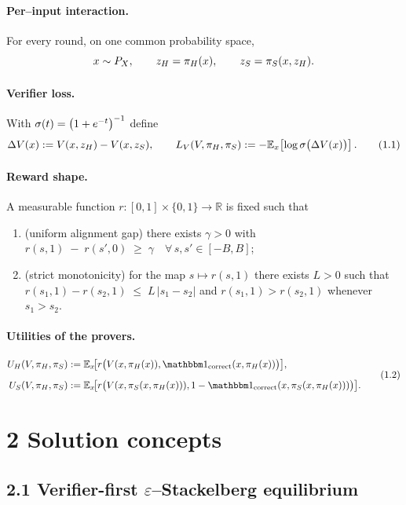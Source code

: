 \paragraph{Per–input interaction.}
For every round, on one common probability space,
\[
x\sim P_X,\qquad
z_H=\pi_H(x),\qquad
z_S=\pi_S(x,z_H).
\]

\paragraph{Verifier loss.}
With $\sigma(t)=\bigl(1+e^{-t}\bigr)^{-1}$ define
\[
\Delta V(x):=V(x,z_H)-V(x,z_S),\qquad
L_V(V,\pi_H,\pi_S)
:=-\mathbb E_{x}\!\left[\log\sigma\bigl(\Delta V(x)\bigr)\right].
\tag{1.1}
\]

\paragraph{Reward shape.}
A measurable function
$r:[0,1]\times\{0,1\}\to\mathbb R$
is fixed such that

\begin{enumerate}
\item[(R1)] (uniform alignment gap) there exists $\gamma>0$ with
      $r(s,1)\;-\;r(s',0)\;\ge\;\gamma\quad\forall\,s,s'\in[-B,B]$;
\item[(R2)] (strict monotonicity) for the map $s\mapsto r(s,1)$ there
      exists $L>0$ such that
      $r(s_1,1)-r(s_2,1)\;\le\;L\,|s_1-s_2|$ and $r(s_1,1)>r(s_2,1)$ whenever $s_1>s_2$.
\end{enumerate}

\paragraph{Utilities of the provers.}
\[
\begin{aligned}
U_H(V,\dH,\dS)
&:=\EE_x\!\bigl[r\bigl(V(x,\dH(x)),\corr(x,\dH(x))\bigr)\bigr],\\[2mm]
U_S(V,\dH,\dS)
&:=\EE_x\!\bigl[r\bigl(V(x,\dS(x,\dH(x))),1-\corr(x,\dS(x,\dH(x)))\bigr)\bigr].
\end{aligned}
\tag{1.2}
\]

\section*{2 \; Solution concepts}

\subsection*{2.1 \; Verifier-first $\varepsilon$–Stackelberg equilibrium}

